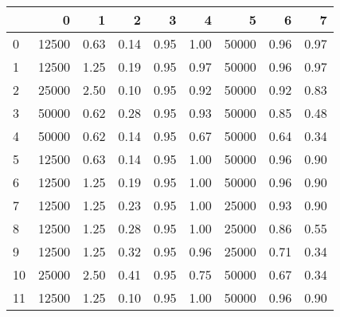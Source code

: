 \begin{tabular}{lrrrrrrrr}
\toprule
{} &      0 &     1 &     2 &     3 &     4 &      5 &     6 &     7 \\
\midrule
0  &  12500 &  0.63 &  0.14 &  0.95 &  1.00 &  50000 &  0.96 &  0.97 \\
1  &  12500 &  1.25 &  0.19 &  0.95 &  0.97 &  50000 &  0.96 &  0.97 \\
2  &  25000 &  2.50 &  0.10 &  0.95 &  0.92 &  50000 &  0.92 &  0.83 \\
3  &  50000 &  0.62 &  0.28 &  0.95 &  0.93 &  50000 &  0.85 &  0.48 \\
4  &  50000 &  0.62 &  0.14 &  0.95 &  0.67 &  50000 &  0.64 &  0.34 \\
5  &  12500 &  0.63 &  0.14 &  0.95 &  1.00 &  50000 &  0.96 &  0.90 \\
6  &  12500 &  1.25 &  0.19 &  0.95 &  1.00 &  50000 &  0.96 &  0.90 \\
7  &  12500 &  1.25 &  0.23 &  0.95 &  1.00 &  25000 &  0.93 &  0.90 \\
8  &  12500 &  1.25 &  0.28 &  0.95 &  1.00 &  25000 &  0.86 &  0.55 \\
9  &  12500 &  1.25 &  0.32 &  0.95 &  0.96 &  25000 &  0.71 &  0.34 \\
10 &  25000 &  2.50 &  0.41 &  0.95 &  0.75 &  50000 &  0.67 &  0.34 \\
11 &  12500 &  1.25 &  0.10 &  0.95 &  1.00 &  50000 &  0.96 &  0.90 \\
\bottomrule
\end{tabular}
